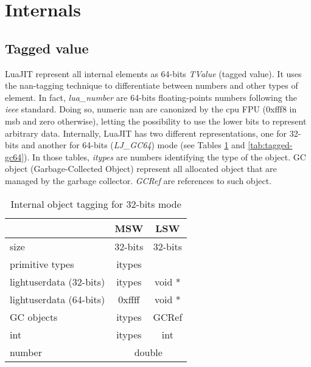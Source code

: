 
 \section{Internals}
 \label{Sec:Internals}


\subsection{Tagged value}
\label{Subsec:tagged-value}

LuaJIT represent all internal elements as 64-bits \emph{TValue} (tagged value).
It uses the nan-tagging technique to differentiate between numbers and other
types of element. In fact, \emph{lua\_number} are 64-bits floating-points numbers
following the \emph{ieee} standard. Doing so, numeric nan are canonized by the
cpu FPU (0xfff8 in msb and zero otherwise), letting the possibility to use the
lower bits to represent arbitrary data. Internally, LuaJIT has two different
representations, one for 32-bits and another for 64-bits (\emph{LJ\_GC64}) mode
(see Tables \ref{tab:tagged-gc32} and \ref{tab:tagged-gc64}). In those tables,
\emph{itypes} are numbers identifying the type of the object.
GC object (Garbage-Collected Object) represent all allocated object
that are managed by the garbage collector. \emph{GCRef} are references to such
object.

\begin{table}[H]
\centering
\caption{Internal object tagging for 32-bits mode}
\label{tab:tagged-gc32}
\begin{tabular}{l|c|c|c|}
\cline{2-4}
                                              & \multicolumn{2}{c|}{MSW}         & LSW         \\ \hline
\multicolumn{1}{|l|}{size}                    & \multicolumn{2}{c|}{32-bits}     & 32-bits     \\ \hline
\multicolumn{1}{|l|}{primitive types}         & \multicolumn{2}{c|}{itypes}      &             \\
\multicolumn{1}{|l|}{lightuserdata (32-bits)} & \multicolumn{2}{c|}{itypes}      & void *      \\
\multicolumn{1}{|l|}{lightuserdata (64-bits)} & 0xffff           & \multicolumn{2}{c|}{void *} \\
\multicolumn{1}{|l|}{GC objects}              & \multicolumn{2}{c|}{itypes}      & GCRef       \\
\multicolumn{1}{|l|}{int}                     & \multicolumn{2}{c|}{itypes}      & int         \\
\multicolumn{1}{|l|}{number}                  & \multicolumn{3}{c|}{double}                    \\ \hline
\end{tabular}
\end{table}

